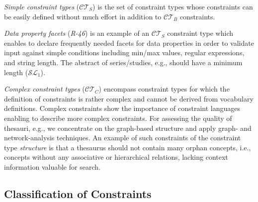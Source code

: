 \documentclass{llncs}
\begin{document}
\emph{Simple constraint types} ($\mathcal{CT}_{S}$) is the set of constraint types whose constraints can be easily defined without much effort in addition to $\mathcal{CT}_{B}$ constraints.
{\emph{Data property facets} (\emph{R-46}) is an example of an $\mathcal{CT}_{S}$ constraint type which enables to declare frequently needed facets for data properties in order to validate input against simple conditions including min/max values, regular expressions, and string length.
The abstract of series/studies, e.g., should have a minimum length ($\mathcal{SL}_{1}$).

\emph{Complex constraint types} ($\mathcal{CT}_{C}$) encompass constraint types for which the definition of constraints is rather complex and cannot be derived from vocabulary definitions.
Complex constraints show the importance of constraint languages enabling to describe more complex constraints.
For assessing the quality of thesauri, e.g., we concentrate on the graph-based structure and apply graph- and network-analysis techniques.
An example of such constraints of the constraint type \emph{structure} is that 
a thesaurus should not contain many orphan concepts, i.e., concepts without any associative or hierarchical relations, lacking context information valuable for search.  

\subsection{Classification of Constraints}

}
\end{document}
